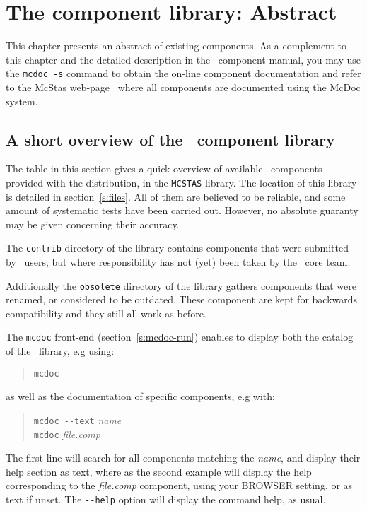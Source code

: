 \chapter{The component library: Abstract}
\label{s:components}

This chapter presents an abstract of existing components.
As a complement to this chapter and the
detailed description in the \MCS\ component manual,
you may use the \verb+mcdoc -s+ command to obtain the on-line
component documentation and refer to the McStas web-page~\cite{mcstas_webpage}
where all components are documented using the McDoc system.

\section{A short overview of the \MCS\ component library}
\label{s:comp-overview}

The table in this section gives a quick overview of available \MCS\ components
provided with the distribution, in the \verb+MCSTAS+ library. The
location of this library is detailed in section~\ref{s:files}.
All of them are believed to be reliable, and some amount of systematic
tests have been carried out.
However, no absolute guaranty may be given concerning their accuracy.

The \verb+contrib+ directory of the library contains components
that were submitted by \MCS\ users,
but where responsibility has not (yet) been taken by the \MCS\ core team. 

Additionally the \verb+obsolete+ directory of the library gathers components that were renamed, or considered to be outdated.
These component are kept for backwards compatibility and
they still all work as before.

The \verb+mcdoc+ front-end (section~\ref{s:mcdoc-run}) enables to display both the
catalog of the \MCS\ library, e.g using: 
\begin{quote}
  \verb|mcdoc|
\end{quote}
as well as the documentation of specific components, e.g with:
\begin{quote}
  \verb|mcdoc --text| {\it name} \\
  \verb|mcdoc| {\it file.comp}
\end{quote}
The first line will search for all components matching the {\it name}, and display their help section as text, where as the second example will display the help corresponding to the {\it file.comp} component, using your BROWSER setting, or as text if unset. The \verb+--help+ option will display the command help, as usual.

